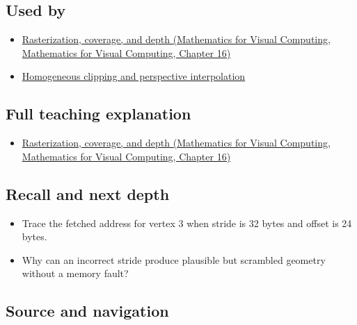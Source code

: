 \subsection{Used by}\label{appendix-749ba51a6c25-used-by}

\begin{itemize}
\tightlist
\item
  \href{../02-Mathematics-for-Visual-Computing/main.pdf\#nameddest=03-visual-computing-i-ch012-rasterization-coverage-and-depth}{Rasterization, coverage, and depth (Mathematics for Visual Computing, Mathematics for Visual Computing, Chapter 16)}
\item
  \hyperref[appendix-40426e4b2103]{Homogeneous clipping and perspective interpolation}
\end{itemize}

\subsection{Full teaching explanation}\label{appendix-749ba51a6c25-full-teaching-explanation}

\begin{itemize}
\tightlist
\item
  \href{../02-Mathematics-for-Visual-Computing/main.pdf\#nameddest=03-visual-computing-i-ch012-rasterization-coverage-and-depth}{Rasterization, coverage, and depth (Mathematics for Visual Computing, Mathematics for Visual Computing, Chapter 16)}
\end{itemize}

\subsection{Recall and next depth}\label{appendix-749ba51a6c25-recall-and-next-depth}

\begin{itemize}
\tightlist
\item
  Trace the fetched address for vertex 3 when stride is 32 bytes and offset is 24 bytes.
\item
  Why can an incorrect stride produce plausible but scrambled geometry without a memory fault?
\end{itemize}

\subsection{Source and navigation}\label{appendix-749ba51a6c25-source-and-navigation}

